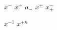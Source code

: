 \documentclass{article}
\begin{document}
  

$x^-$ $x^{+}$ $a_-$ $x^{\pm}$ $x_{+}^{-}$

$x^{-1}$ $x^{+n}$
\end{document}
